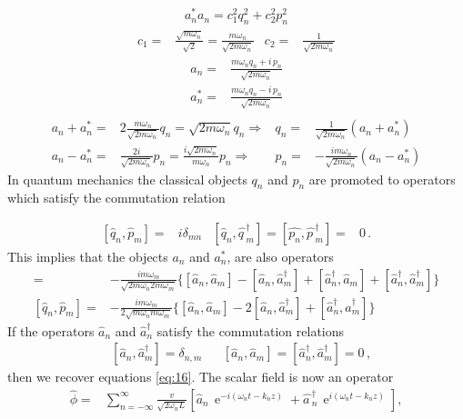 \begin{frame}
\begin{align}
  a_n^*a_n=c_1^2 q_n^2+c_2^2 p_n^2
\end{align}
\begin{align}
c_1=&\frac{\sqrt{m\omega_n}}{\sqrt{2}}=\frac{m\omega_n}{\sqrt{2m\omega_n}}   & c_2=&\frac{1}{\sqrt{2m\omega_n}}
\end{align}
\begin{align}
  a_n=&\frac{m\omega_n q_n+i\,p_n}{\sqrt{2m\omega_n}}\nonumber\\
  a_n^*=&\frac{m\omega_n q_n-i\,p_n}{\sqrt{2m\omega_n}}\nonumber\\
\end{align}
\begin{align}
a_n+a_n^*=& 2\frac{m\omega_n}{\sqrt{2m\omega_n}}q_n=\sqrt{2m\omega_n}q_n \Rightarrow& q_n=&\frac{1}{\sqrt{2m\omega_n}}(a_n+a_n^*) \nonumber\\
a_n-a_n^*=&\frac{2i}{\sqrt{2m\omega_n}}p_n=\frac{i\sqrt{2m\omega_n}}{m\omega_n}p_n
\Rightarrow& p_n=&-\frac{im\omega_n}{\sqrt{2m\omega_n}}(a_n-a_n^*) 
\end{align}
In quantum mechanics the classical objects $q_n$ and $p_n$ are promoted to operators which satisfy the commutation relation

\begin{align}
\label{eq:16}
  [\widehat{q}_n,\widehat{p}_m]=&i\delta_{m n} &
  [\widehat{q}_n,\widehat{q\,}_m^\dagger]= [\widehat{p_n},\widehat{p\,}_m^\dagger]=&0\,. 
\end{align}
This implies that the objects $a_n$ and $a_n^*$, are also operators
\begin{align}
  [\widehat{q}_n,\widehat{p}_m]=&-\frac{i m\omega_m}{\sqrt{2m\omega_n 2m\omega_m}}\{ 
[\widehat{a}_{n},\widehat{a}_{m}]-[\widehat{a}_{n},\widehat{a}_{m}^\dagger]
+[\widehat{a}_{n}^\dagger,\widehat{a}_{m}]+[\widehat{a}_{n}^\dagger,\widehat{a}_{m}^\dagger]
\} \nonumber\\
  [\widehat{q}_n,\widehat{p}_m]=&-\frac{i m\omega_m}{2\sqrt{m\omega_n m\omega_m}}\{ 
[\widehat{a}_{n},\widehat{a}_{m}]-2[\widehat{a}_{n},\widehat{a}_{m}^\dagger]
+[\widehat{a}_{n}^\dagger,\widehat{a}_{m}^\dagger]
\} 
\end{align}
If the operators $\widehat{a}_{n}$ and $\widehat{a}_{n}^\dagger$ satisfy the commutation relations
\begin{align}
\label{eq:17}
  &\left[\widehat{a}_{n},\widehat{a}_{m}^\dagger\right]=
\delta_{{n},{m}}&
&\left[\widehat{a}_{n},\widehat{a}_{m}\right]=
\left[\widehat{a}_{n}^\dagger,\widehat{a}_{m}^\dagger\right]=0\,,
\end{align}
then we recover equations \eqref{eq:16}. The scalar field is now an operator
\begin{align}
\label{eq:18}
  \widehat{\phi}=&\sum_{n=-\infty}^\infty\frac{v}{\sqrt{2\omega_nL}}
  \left[\widehat{a}_n\,\operatorname{e}^{-i(\omega_n t-k_n z)}+\widehat{a\,}_n^\dagger\,\operatorname{e}^{i(\omega_n t-k_n z)}\right],
\end{align}



\end{frame}

